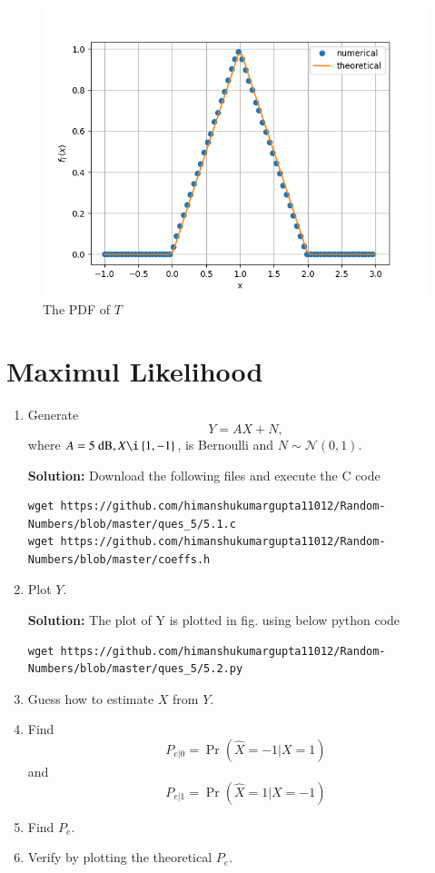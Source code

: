 \documentclass[journal,12pt,twocolumn]{IEEEtran}
\renewcommand\thesection{\arabic{section}}
\providecommand{\pr}[1]{\ensuremath{\Pr\left(#1\right)}}
\providecommand{\cbrak}[1]{\ensuremath{\left\{#1\right\}}}
\theoremstyle{remark}
\providecommand{\gauss}[2]{\mathcal{N}\ensuremath{\left(#1,#2\right)}}
\newcommand{\solution}{\noindent \textbf{Solution: }}
\numberwithin{equation}{section}
\begin{document}
\begin{enumerate}[label=\thesection.\arabic*
,ref=\thesection.\theenumi]
\begin{figure}
	\centering
		\includegraphics[width=\columnwidth]{./ques_4/tri_pdf.png}
	\caption{The PDF of $T$}
	\label{tri_pdf}
\end{figure}

\end{enumerate}
\section{Maximul Likelihood}
\begin{enumerate}[label=\thesection.\arabic*
,ref=\thesection.\theenumi]
\item Generate 
\begin{equation}
Y = AX+N,
\end{equation}
		where $A = 5 \text{ dB}, X \i \cbrak{1,-1}$,  is Bernoulli and $N \sim \gauss{0}{1}$.
		
	\solution Download the following files and execute the C code
	\begin{lstlisting}
wget https://github.com/himanshukumargupta11012/Random-Numbers/blob/master/ques_5/5.1.c
wget https://github.com/himanshukumargupta11012/Random-Numbers/blob/master/coeffs.h
	\end{lstlisting}
	\item Plot $Y$.
	
	\solution
	The plot of Y is plotted in fig. using below python code
	\begin{lstlisting}
wget https://github.com/himanshukumargupta11012/Random-Numbers/blob/master/ques_5/5.2.py
	\end{lstlisting} 
	\item Guess how to estimate $X$ from $Y$.
\item
\label{ml-ch4_sim}
Find 
\begin{equation}
	P_{e|0} = \pr{\hat{X} = -1|X=1}
\end{equation}
and 
\begin{equation}
	P_{e|1} = \pr{\hat{X} = 1|X=-1}
\end{equation}
%
\item Find $P_e$.
%
\item
Verify by plotting  the theoretical $P_e$.  
		\end{enumerate}
\end{document}
